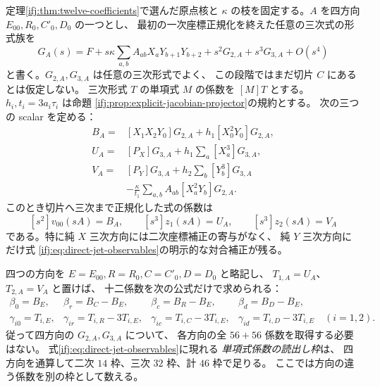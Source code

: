 \begin{proposition}
\label{ifj:prop:direct-probe-readout}
定理\ref{ifj:thm:twelve-coefficients}で選んだ原点核と
$\kappa$ の枝を固定する。$A$ を四方向
$E_{00},R_0,C'_0,D_0$ の一つとし、
最初の一次座標正規化を終えた任意の三次式の形式族を
\[
 G_A(s)=F+s\kappa\sum_{a,b}A_{ab}X_aY_{b+1}Y_{b+2}
                 +s^2G_{2,A}+s^3G_{3,A}+O(s^4)
\]
と書く。$G_{2,A},G_{3,A}$ は任意の三次形式でよく、
この段階ではまだ切片 $C$ にあるとは仮定しない。
三次形式 $T$ の単項式 $M$ の係数を $[M]T$ とする。
$h_i,t_i=3a_i\tau_i$ は命題
\ref{ifj:prop:explicit-jacobian-projector}の規約とする。
次の三つの scalar を定める：
\begin{equation}\label{ifj:eq:direct-jet-observables}
\begin{aligned}
 B_A={}&[X_1X_2Y_0]G_{2,A}
                 +h_1[X_0^2Y_0]G_{2,A},\\
 U_A={}&[P_X]G_{3,A}+h_1\sum_a[X_a^3]G_{3,A},\\
 V_A={}&[P_Y]G_{3,A}+h_2\sum_b[Y_b^3]G_{3,A}\\
       &-\frac{\kappa}{t_1}
              \sum_{a,b}A_{ab}[X_a^2Y_b]G_{2,A}.
\end{aligned}
\end{equation}
このとき切片へ三次まで正規化した式の係数は
\[
 [s^2]v_{00}(sA)=B_A,\qquad
 [s^3]z_1(sA)=U_A,\qquad [s^3]z_2(sA)=V_A
\]
である。特に純 $X$ 三次方向には二次座標補正の寄与がなく、
純 $Y$ 三次方向にだけ式
\eqref{ifj:eq:direct-jet-observables}の明示的な対合補正が残る。

四つの方向を $E=E_{00},R=R_0,C=C'_0,D=D_0$ と略記し、
$T_{1,A}=U_A$、$T_{2,A}=V_A$ と置けば、
十二係数を次の公式だけで求められる：
\begin{equation}\label{ifj:eq:direct-twelve-readout}
\begin{array}{llll}
 \beta_0=B_E,& \beta_r=B_C-B_E,&
 \beta_c=B_R-B_E,&\beta_d=B_D-B_E,\\
 \gamma_{i0}=T_{i,E},&
 \gamma_{ir}=T_{i,R}-3T_{i,E},&
 \gamma_{ic}=T_{i,C}-3T_{i,E},&
 \gamma_{id}=T_{i,D}-3T_{i,E}\quad(i=1,2).
\end{array}
\end{equation}
従って四方向の $G_{2,A},G_{3,A}$ について、
各方向の全 $56+56$ 係数を取得する必要はない。
式\eqref{ifj:eq:direct-jet-observables}に現れる
\emph{単項式係数の読出し枠}は、
四方向を通算して二次 $14$ 枠、三次 $32$ 枠、計 $46$ 枠で足りる。
ここでは方向の違う係数を別の枠として数える。
\end{proposition}

